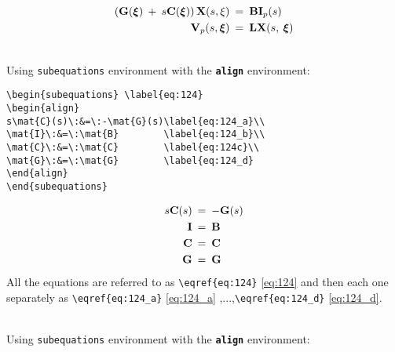 %
%
\begin{subequations} \label{eq:PEEC_form1}
	\begin{align}
		\left(\mathbf{G}(\mbox{$\boldsymbol{\xi}$})\:+\: s \mathbf{C}(\mbox{$\boldsymbol{\xi}$})\right)\mathbf{X}(s,\xi)\: &= \: \mathbf{B}\mathbf{I}_p(s) \label{eq:PEEC_form1_a}\\
		\mathbf{V}_p(s,\mbox{$\boldsymbol{\xi}$})\:&=\:\mathbf{L}\mathbf{X}(s,\:\mbox{$\boldsymbol{\xi}$}) \label{eq:PEEC_form1_b}
	\end{align}
\end{subequations}
%
%
\raggedright{}\\
Using \texttt{subequations} environment with the \textbf{\texttt{align}} environment:
%
%
\begin{verbatim}
\begin{subequations} \label{eq:124}
\begin{align}   
s\mat{C}(s)\:&=\:-\mat{G}(s)\label{eq:124_a}\\
\mat{I}\:&=\:\mat{B}        \label{eq:124_b}\\
\mat{C}\:&=\:\mat{C}        \label{eq:124c}\\
\mat{G}\:&=\:\mat{G}        \label{eq:124_d}
\end{align}
\end{subequations}
\end{verbatim}
%
%
\begin{subequations} \label{eq:124}
	\begin{align}   
		s\mathbf{C}(s)\:&=\:-\mathbf{G}(s)\label{eq:124_a}\\
		\mathbf{I}\:&=\:\mathbf{B}        \label{eq:124_b}\\
		\mathbf{C}\:&=\:\mathbf{C}        \label{eq:124_c}\\
		\mathbf{G}\:&=\:\mathbf{G}        \label{eq:124_d}
	\end{align}
\end{subequations}
%
All the equations are referred to as \verb!\eqref{eq:124}! \eqref{eq:124} and then each one separately as \verb!\eqref{eq:124_a}! \eqref{eq:124_a} ,...,\verb!\eqref{eq:124_d}! \eqref{eq:124_d}.
%
\par \raggedright{}\\
Using \texttt{subequations} environment with the \textbf{\texttt{align}} environment:
